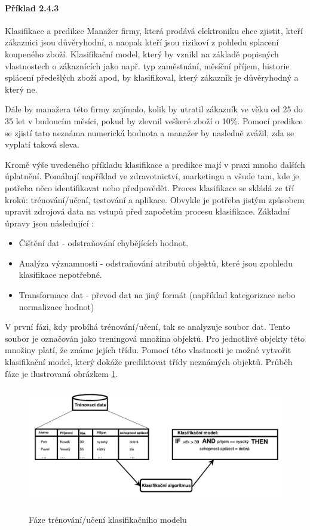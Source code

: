 \paragraph{Příklad 2.4.3} Klasifikace a predikce \newline
Manažer firmy, která prodává elektroniku chce zjistit, kteří zákaznici jsou důvěryhodní, a naopak kteří jsou rizikoví z pohledu splacení koupeného zboží. Klasifikační model, který by vznikl na základě popisných vlastnostech o zákaznících jako např. typ zaměstnání, měsíční příjem, historie splácení předešlých zboží apod, by klasifikoval, který zákazník je důvěryhodný a který ne.

Dále by manažera této firmy zajímalo, kolik by utratil zákazník ve věku od 25 do 35 let v budoucím měsíci, pokud by zlevnil veškeré zboží o 10\%. Pomocí predikce se zjistí tato neznáma numerická hodnota a manažer by nasledně zvážil, zda se vyplatí taková sleva.\newline

Kromě výše uvedeného příkladu klasifikace a predikce mají v praxi mnoho dalších úplatnění. Pomáhají například ve zdravotnictví, marketingu a všude tam, kde je potřeba něco identifikovat nebo předpovědět.
Proces klasifikace se skládá ze tří kroků: trénování/učení, testování a aplikace. Obvykle je potřeba jistým způsobem upravit zdrojová data na vstupů před započetím procesu klasifikace. Základní úpravy jsou následující \cite{Han}:

\begin{itemize}
    \item Čištění dat - odstraňování chybějících hodnot.
    \item Analýza významnosti - odstraňování atributů objektů, které jsou zpohledu klasifikace nepotřebné.
    \item Transformace dat - převod dat na jiný formát (například kategorizace nebo normalizace hodnot)
\end{itemize}

V první fázi, kdy probíhá trénování/učení, tak se analyzuje soubor dat. Tento soubor je označován jako treningová množina objektů. Pro jednotlivé objekty této množiny platí, že známe jejích třídu. Pomocí této vlastnosti je možné vytvořit klasifikační model, který dokáže prediktovat třídy neznámých objektů. Průběh fáze je ilustrovaná obrázkem \ref{faze-trenovani}. \cite{Bharati} 

\begin{figure}[h]\centering
  \centering
  \includegraphics[width=\linewidth,height=2.0in]{obrazky/trenovacifaze.pdf}\\[1pt]
  \caption{Fáze trénování/učení klasifikačního modelu}
  \label{faze-trenovani}
\end{figure}

